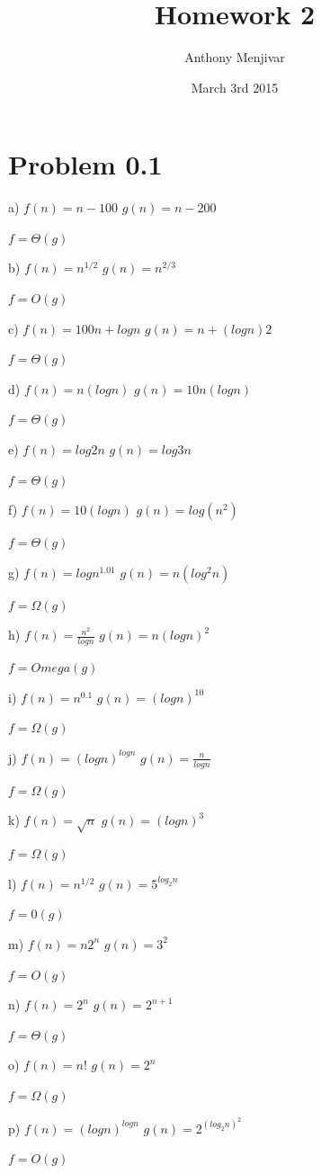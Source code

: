 \documentclass{article}
\title{Homework 2}
\author{Anthony Menjivar}
\date{March 3rd 2015}
\begin{document}
\maketitle

\section{Problem 0.1}
a) $f(n) = n - 100$ $g(n) = n - 200$	

$f = \Theta(g)$

b) $f(n) = n^{1/2}$ $g(n) = n^{2/3}$   

$f = O(g)$

c) $f(n) = 100n + logn$ $g(n) = n + (logn)2$

$f = \Theta(g)$

d) $f(n) = n(logn)$ $g(n) = 10n(logn) $

$f = \Theta(g)$

e) $f(n) = log2n$ $g(n) = log3n$

$f = \Theta(g)$

f) $f(n) = 10(logn)$ $g(n) = log(n^{2})$ 

$f = \Theta(g)$

g) $f(n) = logn^{1.01}$ $g(n) = n(log^{2}n)$  

$f = \Omega(g)$

h) $f(n) = \frac{n^{2}}{logn}$ $g(n) = n(logn)^{2}$

$f = Omega(g)$

i) $f(n) = n^{0.1}$ $g(n) = (logn)^{10}$ 

$f = \Omega(g)$ 

j) $f(n) = (logn)^{logn}$ $g(n) = \frac{n}{logn}$

$ f = \Omega(g)$

k) $f(n) = \sqrt{n}$ $g(n) = (logn)^{3}$ 

$f = \Omega(g)$

l) $f(n) = n^{1/2}$ $g(n) = 5^{log_{2}n}$ 

$f = 0(g)$

m) $f(n) = n2^{n}$ $g(n) = 3^{2}$ 

$f = O(g)$

n) $f(n) = 2^{n}$ $g(n) = 2^{n+1}$ 

$f = \Theta(g)$

o) $f(n) = n!$ $g(n) = 2^{n}$ 

$f = \Omega(g)$

p) $f(n) = (logn)^{logn}$ $g(n) = 2^{(log_{2}n)^{2}}$ 

$f = O(g)$
\end{document}
